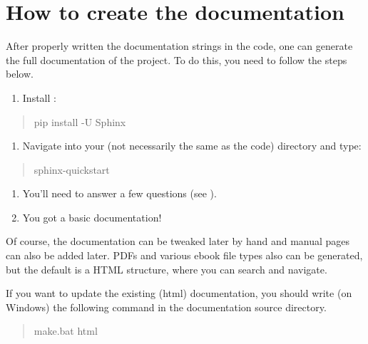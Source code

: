 \documentclass[letterpaper,10pt,english]{sphinxmanual}
\begin{document}
\section{How to create the documentation}
\label{\detokenize{styleguide:how-to-create-the-documentation}}
After properly written the documentation strings in the code, one can generate the full documentation of the project. To do this, you need to follow the steps below.
\begin{enumerate}
%
\item {} 
Install :

\end{enumerate}
\begin{quote}

pip install -U Sphinx
\end{quote}
\begin{enumerate}
%
\item {} 
Navigate into your  (not necessarily the same as the code) directory and type:

\end{enumerate}
\begin{quote}

sphinx-quickstart
\end{quote}
\begin{enumerate}
%
\item {} 
You’ll need to answer a few questions (see ).

\item {} 
You got a basic documentation!

\end{enumerate}

Of course, the documentation can be tweaked later by hand and manual pages can also be added later. PDFs and various ebook file types also can be generated, but the default is a HTML structure, where you can search and navigate.

If you want to update the existing (html) documentation, you should write (on Windows) the following command in the documentation source directory.
\begin{quote}

make.bat html
\end{quote}
\end{document}
